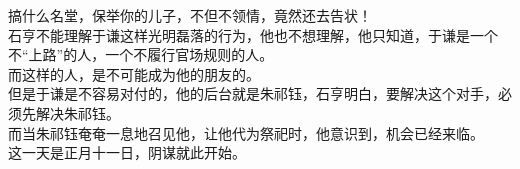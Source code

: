 \begin{multicols}{\theparacolNo}
搞什么名堂，保举你的儿子，不但不领情，竟然还去告状！\\

石亨不能理解于谦这样光明磊落的行为，他也不想理解，他只知道，于谦是一个不“上路”的人，一个不履行官场规则的人。\\

而这样的人，是不可能成为他的朋友的。\\

但是于谦是不容易对付的，他的后台就是朱祁钰，石亨明白，要解决这个对手，必须先解决朱祁钰。\\

而当朱祁钰奄奄一息地召见他，让他代为祭祀时，他意识到，机会已经来临。\\

这一天是正月十一日，阴谋就此开始。\\
\ifnum{}
	\end{multicols}
\fi
\newpage
